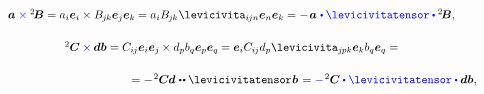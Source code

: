 \begin{otherlanguage}{russian}
\nopagebreak\vspace{-0.1em}\begin{equation*}
\begin{array}{c}
\bm{a} \hspace{.1ex} \mathcolor{blue}{\times} {^2\hspace{-0.16em}\bm{B}} = a_i \bm{e}_i \times B_{\hspace{-0.1ex}j\hspace{-0.1ex}k} \bm{e}_j \bm{e}_k \hspace{-0.1ex} = \tikzmark{BeginVectorCrossTensor} a_i B_{\hspace{-0.1ex}j\hspace{-0.1ex}k} \hspace{.1ex} \levicivita_{i\hspace{-0.1ex}jn} \tikzmark{EndVectorCrossTensor} \bm{e}_n \bm{e}_k = \mathcolor{blue}{-} \hspace{.2ex} \bm{a} \hspace{.15ex} \mathcolor{blue}{\dotp \levicivitatensor \dotp} {^2\!\bm{B}} ,
\\[1.6em]
%
{^2\hspace{-0.05ex}\bm{C}} \mathcolor{blue}{\times} \hspace{-0.1ex} \bm{d} \bm{b} = C_{i\hspace{-0.1ex}j} \bm{e}_i \bm{e}_j \hspace{-0.1ex} \times d_p b_q \bm{e}_p \bm{e}_q \hspace{-0.1ex} = \bm{e}_i C_{i\hspace{-0.1ex}j} d_p \tikzmark{BeginTensorCrossTensor} \levicivita_{j\hspace{-0.1ex}pk} \tikzmark{EndTensorCrossTensor} \bm{e}_k b_q \bm{e}_q =
\\[1.6em]
\hspace{12.5em} =
- \hspace{.2ex} {^2\hspace{-0.05ex}\bm{C}} \hspace{-0.1ex} \bm{d} \hspace{.12ex} \dotdotp \levicivitatensor \hspace{.1ex} \bm{b} \hspace{.2ex} =
\mathcolor{blue}{-} \hspace{.2ex} {^2\hspace{-0.05ex}\bm{C}} \mathcolor{blue}{\dotp \levicivitatensor \dotp} \bm{d} \bm{b} ,
\\
\end{array}
\end{equation*}%

\end{otherlanguage}
